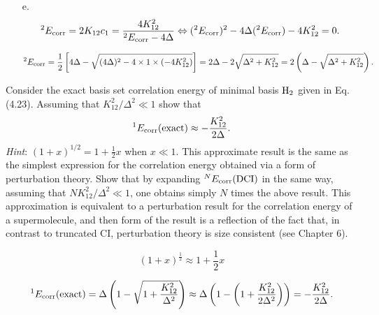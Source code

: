 \documentclass[a4paper]{book}
\newcommand{\corr}{{\rm corr}}
\begin{document}
\begin{solution}
\begin{itemize}
	\item[e.]
	\[
		^2 E_\corr = 2 K_{12} c_1 = \frac{ 4K^2_{12} }{ ^2 E_\corr - 4 \Delta } \Leftrightarrow ( ^2 E_\corr )^2 - 4 \Delta ( ^2 E_\corr ) - 4 K^2_{12} = 0.
	\]
	
	\[
		^2 E_\corr = \frac{1}{2} \left[ 4 \Delta - \sqrt{ ( 4 \Delta )^2 - 4 \times 1 \times ( -4 K^2_{12} ) } \right] = 2 \Delta - 2 \sqrt{ \Delta^2 + K^2_{12} } = 2 \left( \Delta - \sqrt{ \Delta^2 + K^2_{12} } \right).
	\]
	
	\end{itemize}		
	
	\end{solution}
	
	\begin{exercise}
	Consider the exact basis set correlation energy of minimal basis $\ce{H2}$ given in Eq.(4.23). Assuming that $K^2_{12}/\Delta^2 \ll 1$ show that
	\[
		{}^{1} E_\corr ({\rm exact}) \approx -\frac{K^2_{12}}{2\Delta}.
	\]
	{\it Hint}: $(1+x)^{1/2} = 1 + \frac{1}{2}x$ when $x \ll 1$. This approximate result is the same as the simplest expression for the correlation energy obtained via a form of perturbation theory. Show that by expanding ${}^{N} E_\corr ({\rm DCI})$ in the same way, assuming that $N K^2_{12} / \Delta^2 \ll 1$, one obtains simply $N$ times the above result. This approximation is equivalent to a perturbation result for the correlation energy of a supermolecule, and then form of the result is a reflection of the fact that, in contrast to truncated CI, perturbation theory is size consistent (see Chapter 6).
	\end{exercise}
	
	\begin{solution}
	
	\[
		(1+x)^{\frac{1}{2}} \approx 1+\frac{1}{2} x
	\]
	
	\[
		^1 E_\corr ({\rm exact}) = \Delta \left( 1 - \sqrt{ 1 + \frac{ K^2_{12} }{ \Delta^2 } } \right) \approx \Delta \left( 1 - \left( 1 + \frac{ K^2_{12} }{ 2\Delta^2 } \right) \right) = -\frac{ K^2_{12} }{ 2\Delta }.
	\]
	
	\end{solution}
	
\end{document}
